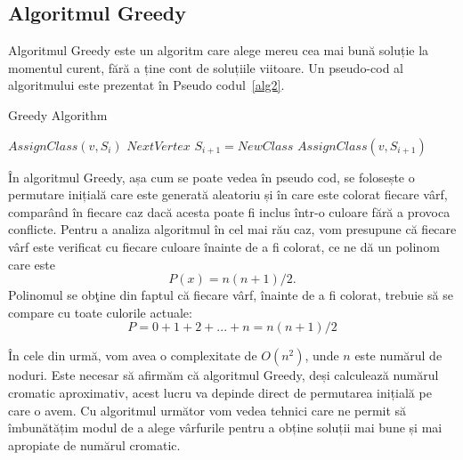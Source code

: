 \documentclass[runningheads]{llncs}
\begin{document}
\subsection{Algoritmul Greedy}
Algoritmul Greedy este un algoritm care alege mereu cea mai bună soluție la
momentul curent, fără a ține cont de soluțiile viitoare.
Un pseudo-cod al algoritmului este prezentat în
Pseudo codul~\ref{alg2}.


\begin{algorithm} 
\caption{Greedy Algorithm}
\label{alg2}
\begin{algorithmic}[1]
\State $AssignClass(v, S_i)$
\State $Next Vertex$
\EndIf
\EndFor
{}
\State $S_{i+1} = NewClass$
\State $AssignClass(v, S_{i+1})$
\EndIf
\EndFor
\EndProcedure
\end{algorithmic}
\end{algorithm}

În algoritmul Greedy, așa cum se poate vedea în pseudo cod,
se folosește o permutare inițială care este generată aleatoriu și în
care este colorat fiecare vârf, comparând în fiecare caz dacă acesta
poate fi inclus într-o culoare fără a provoca conflicte. Pentru a analiza
algoritmul în cel mai rău caz, vom presupune că fiecare vârf este 
verificat cu fiecare culoare înainte de a fi colorat,
ce ne dă un polinom care este
\begin{equation} P(x) = n(n+1)/2. \end{equation} Polinomul
se obţine din faptul că fiecare vârf, înainte de a fi colorat,
trebuie să se compare cu toate culorile actuale:
\begin{equation} P = 0 + 1 + 2 + . . . + n = n(n + 1)/2 \end{equation}

În cele din urmă, vom avea o complexitate de $O(n^2)$, unde $n$ este numărul
de noduri. Este necesar să afirmăm că algoritmul Greedy, deși calculează
numărul cromatic aproximativ, acest lucru va depinde direct de permutarea
inițială pe care o avem. Cu algoritmul următor vom vedea tehnici care ne
permit să îmbunătățim modul de a alege vârfurile pentru a obține soluții
mai bune și mai apropiate de numărul cromatic.
\end{document}
